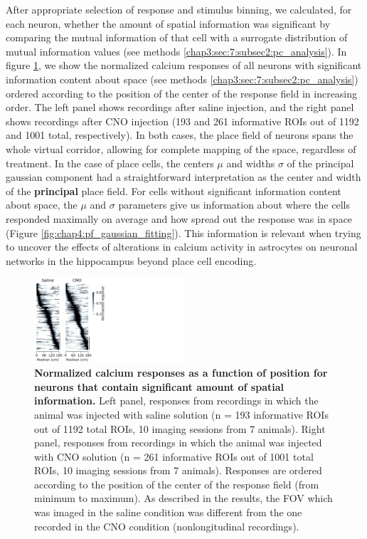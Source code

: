 After appropriate selection of response and stimulus binning, we calculated, for each neuron, whether the amount of spatial information was significant by comparing the mutual information of that cell with a surrogate distribution of mutual information values (see methods \ref{chap3:sec:7:subsec2:pc_analysis}).
In figure \ref{fig:chap4:snake_plot_2p}, we show the normalized calcium responses of all neurons with significant information content about space (see methods \ref{chap3:sec:7:subsec2:pc_analysis}) ordered according to the position of the center of the response field in increasing order.
The left panel shows recordings after saline injection, and the right panel shows recordings after CNO injection (193 and 261 informative  ROIs out  of  1192 and 1001 total, respectively). 
In both cases, the place field of neurons spans the whole virtual corridor, allowing for complete mapping of the space, regardless of treatment. 
In the case of place cells, the centers $\mu$ and widths $\sigma$ of the principal gaussian component had a straightforward interpretation as the center and width of the \textbf{principal} place field. 
For cells without significant information content about space, the $\mu$ and $\sigma$ parameters give us information about where the cells responded maximally on average and how spread out the response was in space (Figure \ref{fig:chap4:pf_gaussian_fitting}).
This information is relevant when trying to uncover the effects of alterations in calcium activity in astrocytes on neuronal networks in the hippocampus beyond place cell encoding.
\begin{figure}
    \centering
    \includegraphics[trim={10 0 510 0},clip,width=0.5\textwidth]{Figures/Chapter4/snake_plots_2p.pdf}
    \caption[Normalized calcium responses as a function of position for neurons that contain significant amount of spatial information]{\textbf{Normalized calcium responses as a function of position for neurons that contain significant amount of spatial information.} 
    Left panel, responses from recordings in which the animal was injected with saline solution (n = 193 informative ROIs out of 1192 total ROIs, 10 imaging sessions from 7 animals). 
    Right panel, responses from recordings in which the animal was injected with CNO solution (n = 261 informative ROIs out of 1001 total ROIs, 10 imaging sessions from 7 animals). 
    Responses are ordered according to the position of the center of the response field (from minimum to maximum). 
    As described in the results, the FOV which was imaged in the saline condition was different from the one recorded in the CNO condition (nonlongitudinal recordings).}
    \label{fig:chap4:snake_plot_2p}
\end{figure}

